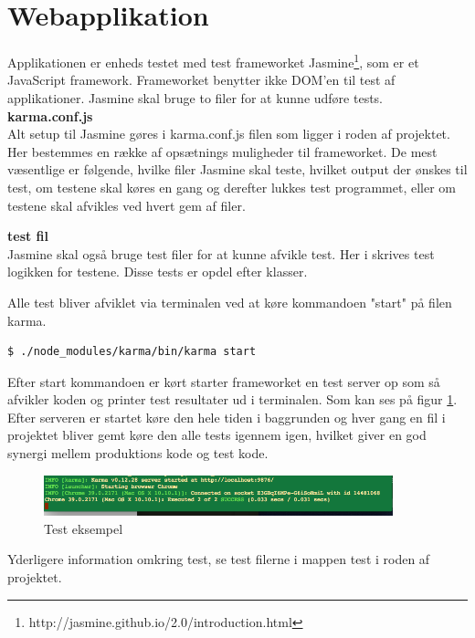 \section{Webapplikation}
Applikationen er enheds testet med test frameworket Jasmine\footnote{http://jasmine.github.io/2.0/introduction.html}, som er et JavaScript framework. Frameworket benytter ikke DOM'en til test af applikationer. Jasmine skal bruge to filer for at kunne udføre tests.\\

\textbf{karma.conf.js}\\
Alt setup til Jasmine gøres i karma.conf.js filen som ligger i roden af projektet. Her bestemmes en række af opsætnings muligheder til frameworket. De mest væsentlige er følgende, hvilke filer Jasmine skal teste, hvilket output der ønskes til test, om testene skal køres en gang og derefter lukkes test programmet, eller om testene skal afvikles ved hvert gem af filer. 

\textbf{test fil}\\
Jasmine skal også bruge test filer for at kunne afvikle test. Her i skrives test logikken for testene. Disse tests er opdel efter klasser.

Alle test bliver afviklet via terminalen ved at køre kommandoen "start" på filen karma.\\

\begin{lstlisting}[language=bash]
	$ ./node_modules/karma/bin/karma start
\end{lstlisting}

Efter start kommandoen er kørt starter frameworket en test server op som så afvikler koden og printer test resultater ud i terminalen. Som kan ses på figur \ref{fig:test_eksempel}. Efter serveren er startet køre den hele tiden i baggrunden og hver gang en fil i projektet bliver gemt køre den alle tests igennem igen, hvilket giver en god synergi mellem produktions kode og test kode.  

\begin{figure}[H]
	\centering
	\includegraphics[width=0.9\textwidth]{Billeder/Test/test_exampel.png}
	\vspace{-0.0cm}
	\caption{Test eksempel}
	\label{fig:test_eksempel}
\end{figure}

Yderligere information omkring test, se test filerne i mappen test i roden af projektet.